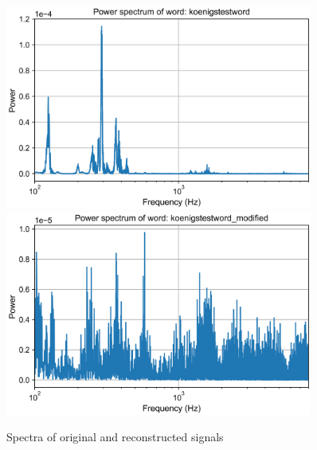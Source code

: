 \documentclass{scrartcl}
\begin{document}
\begin{figure}[p]
	\centering
	\includegraphics[width=0.9\textwidth]{figures/spectrum_koenigstestword}
	\includegraphics[width=0.9\textwidth]{figures/spectrum_koenigstestword_modified}
	\caption{Spectra of original and reconstructed signals}
	\label{fig:spectrum}
\end{figure}
\end{document}
